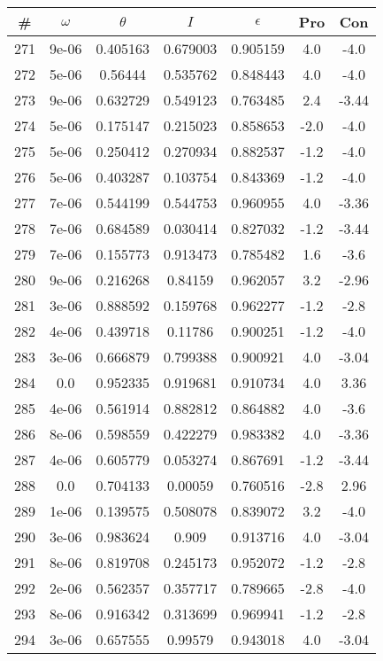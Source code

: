 \begin{table}
\begin{tabular}{c|c|c|c|c|c|c}
\# & $\omega$ & $\theta$ & $I$ & $\epsilon$ & Pro & Con\\
\hline
271 & 9e-06 & 0.405163 & 0.679003 & 0.905159 & 4.0 & -4.0\\
272 & 5e-06 & 0.56444 & 0.535762 & 0.848443 & 4.0 & -4.0\\
273 & 9e-06 & 0.632729 & 0.549123 & 0.763485 & 2.4 & -3.44\\
274 & 5e-06 & 0.175147 & 0.215023 & 0.858653 & -2.0 & -4.0\\
275 & 5e-06 & 0.250412 & 0.270934 & 0.882537 & -1.2 & -4.0\\
276 & 5e-06 & 0.403287 & 0.103754 & 0.843369 & -1.2 & -4.0\\
277 & 7e-06 & 0.544199 & 0.544753 & 0.960955 & 4.0 & -3.36\\
278 & 7e-06 & 0.684589 & 0.030414 & 0.827032 & -1.2 & -3.44\\
279 & 7e-06 & 0.155773 & 0.913473 & 0.785482 & 1.6 & -3.6\\
280 & 9e-06 & 0.216268 & 0.84159 & 0.962057 & 3.2 & -2.96\\
281 & 3e-06 & 0.888592 & 0.159768 & 0.962277 & -1.2 & -2.8\\
282 & 4e-06 & 0.439718 & 0.11786 & 0.900251 & -1.2 & -4.0\\
283 & 3e-06 & 0.666879 & 0.799388 & 0.900921 & 4.0 & -3.04\\
284 & 0.0 & 0.952335 & 0.919681 & 0.910734 & 4.0 & 3.36\\
285 & 4e-06 & 0.561914 & 0.882812 & 0.864882 & 4.0 & -3.6\\
286 & 8e-06 & 0.598559 & 0.422279 & 0.983382 & 4.0 & -3.36\\
287 & 4e-06 & 0.605779 & 0.053274 & 0.867691 & -1.2 & -3.44\\
288 & 0.0 & 0.704133 & 0.00059 & 0.760516 & -2.8 & 2.96\\
289 & 1e-06 & 0.139575 & 0.508078 & 0.839072 & 3.2 & -4.0\\
290 & 3e-06 & 0.983624 & 0.909 & 0.913716 & 4.0 & -3.04\\
291 & 8e-06 & 0.819708 & 0.245173 & 0.952072 & -1.2 & -2.8\\
292 & 2e-06 & 0.562357 & 0.357717 & 0.789665 & -2.8 & -4.0\\
293 & 8e-06 & 0.916342 & 0.313699 & 0.969941 & -1.2 & -2.8\\
294 & 3e-06 & 0.657555 & 0.99579 & 0.943018 & 4.0 & -3.04\\

\end{tabular}
\end{table}
